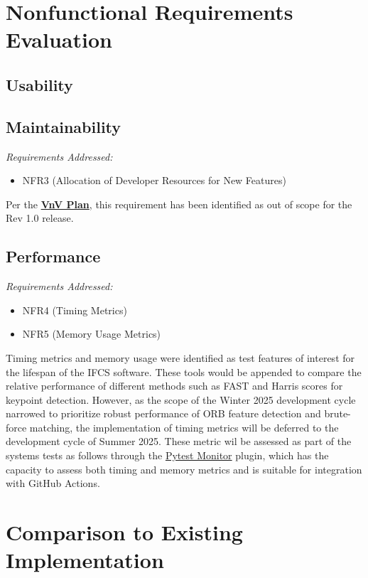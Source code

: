 \documentclass[12pt, titlepage]{article}
\begin{document}
\section{Nonfunctional Requirements Evaluation}

\subsection{Usability}

\subsection{Maintainability}
\textit{Requirements Addressed:} 
\begin{itemize}
\item NFR3 (Allocation of Developer Resources for New Features)
\end{itemize}
Per the \href{https://github.com/KiranSingh15/CAS-741-Image-Correspondences/blob/main/docs/VnVPlan/VnVPlan.pdf}{\textbf{VnV Plan}}, this requirement has been identified as out of scope for the Rev 1.0 release.
		
\subsection{Performance}
\textit{Requirements Addressed:} 
\begin{itemize}
\item NFR4 (Timing Metrics)
\item NFR5 (Memory Usage Metrics)
\end{itemize}
Timing metrics and memory usage were identified as test features of interest for the lifespan of the IFCS software. These tools would be appended to compare the relative performance of different methods such as FAST and Harris scores for keypoint detection. However, as the scope of the Winter 2025 development cycle narrowed to prioritize robust performance of ORB feature detection and brute-force matching, the implementation of timing metrics will be deferred to the development cycle of Summer 2025. These metric wil be assessed as part of the systems tests as follows through the \href{https://pypi.org/project/pytest-monitor/}{Pytest Monitor} plugin, which has the capacity to assess both timing and memory metrics and is suitable for integration with GitHub Actions.

	
\section{Comparison to Existing Implementation}	
\end{document}
